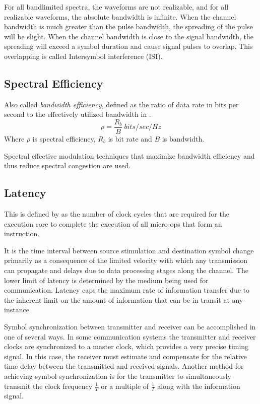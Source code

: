 For all bandlimited spectra, the waveforms are not realizable, and for all realizable waveforms, the
absolute bandwidth is infinite. When the channel bandwidth is much greater than the pulse bandwidth,
the spreading of the pulse will be slight. When the channel bandwidth is close to the signal bandwidth,
the spreading will exceed a symbol duration and cause signal pulses to overlap. This overlapping is called
Intersymbol interference (ISI).\cite{AWGN}

\subsection*{Spectral Efficiency}
Also called \textit{bandwidth efficiency}, defined as the ratio of data rate in bits per second to the effectively utilized bandwidth in \cite{hayk}.
$$\rho = \frac{R_b}{B}\ bits/sec/Hz$$
Where $\rho$ is spectral efficiency, $R_b$ is bit rate and $B$ is bandwidth.

Spectral effective modulation techniques that maximize bandwidth efficiency and thus reduce spectral
congestion are used.\cite{AWGN}

\subsection*{Latency}
This is defined by \cite{latintel} as the number of clock cycles that are required for the execution core to complete the execution of all micro-ops that form an instruction.

It is the time interval between source stimulation and destination symbol change primarily as a consequence of the limited velocity with which any transmission can propagate and delays due to data processing stages along the channel.
The lower limit of latency is determined by the medium being used for communication. Latency caps the maximum rate of information transfer due to the inherent limit on the amount of information that can be in transit at any instance. 

Symbol
synchronization between transmitter and receiver can be accomplished in one of several ways. In some
communication systems the transmitter and receiver clocks are synchronized to a master clock, which
provides a very precise timing signal. In this case, the receiver must estimate and compensate for the
relative time delay between the transmitted and received signals. Another method for achieving symbol
synchronization is for the transmitter to simultaneously transmit the clock frequency $\frac{1}{T}$ or a multiple of
$\frac{1}{T}$ along with the information signal.\cite{Salehi}

